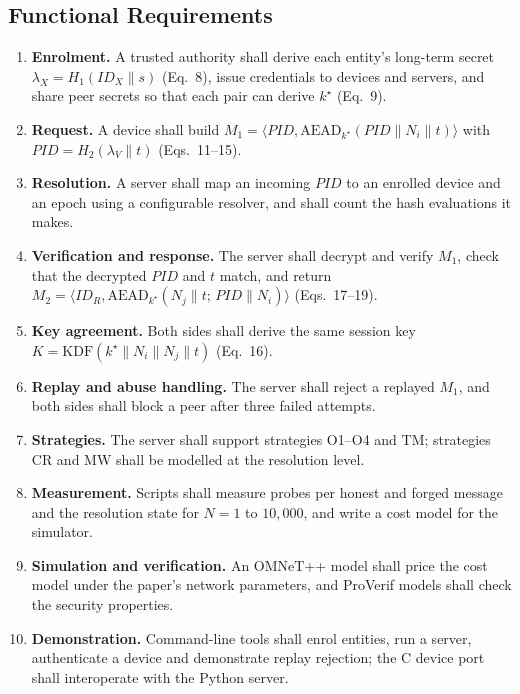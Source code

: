 \subsection{Functional Requirements}
\begin{enumerate}[label=FR-\arabic*]
\item \textbf{Enrolment.} A trusted authority shall derive each entity's long-term secret $\lambda_X=H_1(ID_X\|s)$ (Eq.~8), issue credentials to devices and servers, and share peer secrets so that each pair can derive $k^\star$ (Eq.~9).
\item \textbf{Request.} A device shall build $M_1=\langle PID,\mathrm{AEAD}_{k^\star}(PID\|N_i\|t)\rangle$ with $PID=H_2(\lambda_V\|t)$ (Eqs.~11--15).
\item \textbf{Resolution.} A server shall map an incoming $PID$ to an enrolled device and an epoch using a configurable resolver, and shall count the hash evaluations it makes.
\item \textbf{Verification and response.} The server shall decrypt and verify $M_1$, check that the decrypted $PID$ and $t$ match, and return $M_2=\langle ID_R,\mathrm{AEAD}_{k^\star}(N_j\|t;\,PID\|N_i)\rangle$ (Eqs.~17--19).
\item \textbf{Key agreement.} Both sides shall derive the same session key $K=\mathrm{KDF}(k^\star\|N_i\|N_j\|t)$ (Eq.~16).
\item \textbf{Replay and abuse handling.} The server shall reject a replayed $M_1$, and both sides shall block a peer after three failed attempts.
\item \textbf{Strategies.} The server shall support strategies O1--O4 and TM; strategies CR and MW shall be modelled at the resolution level.
\item \textbf{Measurement.} Scripts shall measure probes per honest and forged message and the resolution state for $N=1$ to $10{,}000$, and write a cost model for the simulator.
\item \textbf{Simulation and verification.} An OMNeT++ model shall price the cost model under the paper's network parameters, and ProVerif models shall check the security properties.
\item \textbf{Demonstration.} Command-line tools shall enrol entities, run a server, authenticate a device and demonstrate replay rejection; the C device port shall interoperate with the Python server.
\end{enumerate}

